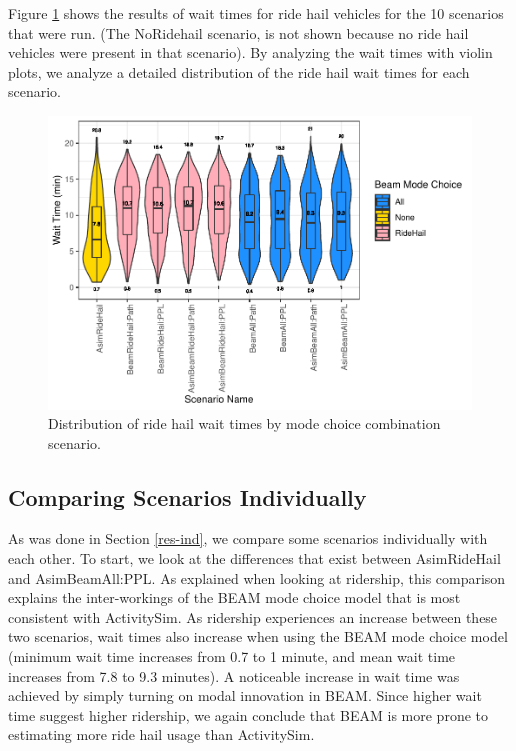 \documentclass[12pt, oneside, openright]{byuthesis}
\begin{document}
Figure \ref{fig:waits} shows the results of wait times for ride hail vehicles for the 10 scenarios that were run. (The NoRidehail scenario, is not shown because no ride hail vehicles were present in that scenario). By analyzing the wait times with violin plots, we analyze a detailed distribution of the ride hail wait times for each scenario.

\begin{figure}

{\centering \includegraphics{thesis_files/figure-latex/waits-1} 

}

\caption{Distribution of ride hail wait times by mode choice combination scenario.}\label{fig:waits}
\end{figure}

\hypertarget{comparing-scenarios-individually}{%
\subsection{Comparing Scenarios Individually}\label{comparing-scenarios-individually}}

As was done in Section \ref{res-ind}, we compare some scenarios individually with each other. To start, we look at the differences that exist between AsimRideHail and AsimBeamAll:PPL. As explained when looking at ridership, this comparison explains the inter-workings of the BEAM mode choice model that is most consistent with ActivitySim. As ridership experiences an increase between these two scenarios, wait times also increase when using the BEAM mode choice model (minimum wait time increases from 0.7 to 1 minute, and mean wait time increases from 7.8 to 9.3 minutes). A noticeable increase in wait time was achieved by simply turning on modal innovation in BEAM. Since higher wait time suggest higher ridership, we again conclude that BEAM is more prone to estimating more ride hail usage than ActivitySim.
\end{document}
